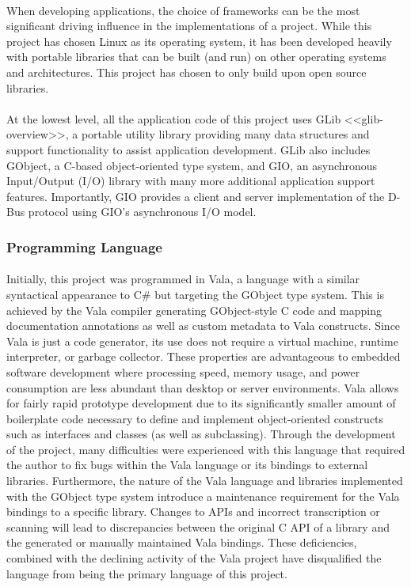 \paragraph{}
When developing applications, the choice of frameworks can be the most significant driving influence in the implementations of a project.
While this project has chosen Linux as its operating system, it has been developed heavily with portable libraries that can be built (and run) on other operating systems and architectures.
This project has chosen to only build upon open source libraries.

\paragraph{}
At the lowest level, all the application code of this project uses GLib <<glib-overview>>, a portable utility library providing many data structures and support functionality to assist application development.
GLib also includes GObject, a C-based object-oriented type system, and GIO, an asynchronous Input/Output (I/O) library with many more additional application support features.
Importantly, GIO provides a client and server implementation of the D-Bus protocol using GIO's asynchronous I/O model.

\subsubsection{Programming Language}

\paragraph{}
Initially, this project was programmed in Vala, a language with a similar syntactical appearance to C\# but targeting the GObject type system.
This is achieved by the Vala compiler generating GObject-style C code and mapping documentation annotations as well as custom metadata to Vala constructs.
Since Vala is just a code generator, its use does not require a virtual machine, runtime interpreter, or garbage collector.
These properties are advantageous to embedded software development where processing speed, memory usage, and power consumption are less abundant than desktop or server environments.
Vala allows for fairly rapid prototype development due to its significantly smaller amount of boilerplate code necessary to define and implement object-oriented constructs such as interfaces and classes (as well as subclassing).
Through the development of the project, many difficulties were experienced with this language that required the author to fix bugs within the Vala language or its bindings to external libraries.
Furthermore, the nature of the Vala language and libraries implemented with the GObject type system introduce a maintenance requirement for the Vala bindings to a specific library.
Changes to APIs and incorrect transcription or scanning will lead to discrepancies between the original C API of a library and the generated or manually maintained Vala bindings.
These deficiencies, combined with the declining activity of the Vala project have disqualified the language from being the primary language of this project.

